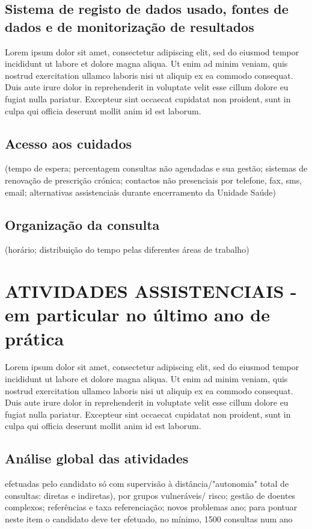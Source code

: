 \documentclass{report}
\begin{document}
\subsection{Sistema de registo de dados usado, fontes de dados e de monitorização de resultados}
Lorem ipsum dolor sit amet, consectetur adipiscing elit, sed do eiusmod tempor incididunt ut labore et dolore magna aliqua. Ut enim ad minim veniam, quis nostrud exercitation ullamco laboris nisi ut aliquip ex ea commodo consequat. Duis aute irure dolor in reprehenderit in voluptate velit esse cillum dolore eu fugiat nulla pariatur. Excepteur sint occaecat cupidatat non proident, sunt in culpa qui officia deserunt mollit anim id est laborum.
\subsection{Acesso aos cuidados}
(tempo de espera; percentagem consultas não agendadas e sua gestão; sistemas de renovação de prescrição crónica; contactos não presenciais por telefone, fax, sms, email; alternativas assistenciais durante encerramento da Unidade Saúde)
\subsection{Organização da consulta}
(horário; distribuição do tempo pelas diferentes áreas de trabalho)

\section{ATIVIDADES ASSISTENCIAIS - em particular no último ano de prática}
Lorem ipsum dolor sit amet, consectetur adipiscing elit, sed do eiusmod tempor incididunt ut labore et dolore magna aliqua. Ut enim ad minim veniam, quis nostrud exercitation ullamco laboris nisi ut aliquip ex ea commodo consequat. Duis aute irure dolor in reprehenderit in voluptate velit esse cillum dolore eu fugiat nulla pariatur. Excepteur sint occaecat cupidatat non proident, sunt in culpa qui officia deserunt mollit anim id est laborum.

\subsection{Análise global das atividades}
efetuadas pelo candidato só com supervisão à distância/"autonomia" total de consultas:
diretas e indiretas), por grupos vulneráveis/ risco; gestão de doentes complexos; referências e taxa referenciação; novos
problemas ano; para pontuar neste item o candidato deve ter efetuado, no mínimo, 1500 consultas num ano
\end{document}
